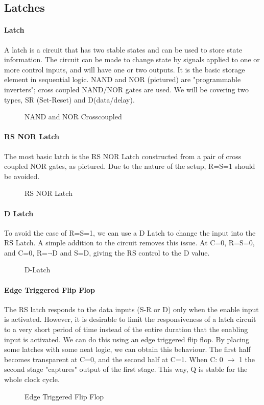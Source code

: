 \subsection{Latches}
\paragraph{Latch} A latch is a circuit that has two stable states and can be used to store state information. The circuit can be made to change state by signals applied to one or more control inputs, and will have one or two outputs. It is the basic storage element in sequential logic. NAND and NOR (pictured) are "programmable inverters"; cross coupled NAND/NOR gates are used. We will be covering two types, SR (Set-Reset) and D(data/delay).
\begin{figure}[!htb]
	\caption{\label{fig:nandnor} NAND and NOR Crosscoupled}
\end{figure}
\paragraph{RS NOR Latch} The most basic latch is the RS NOR Latch constructed from a pair of cross coupled NOR gates, as pictured. Due to the nature of the setup, R=S=1 should be avoided.
\begin{figure}[!htb]
	\caption{\label{fig:norlatch} RS NOR Latch}
\end{figure}
\paragraph{D Latch} To avoid the case of R=S=1, we can use a D Latch to change the input into the RS Latch. A simple addition to the circuit removes this issue. At C=0, R=S=0, and C=0, R=$\neg$D and S=D, giving the RS control to the D value.
\begin{figure}[!htb]
	\caption{\label{fig:dlatch} D-Latch}
\end{figure}
\paragraph{Edge Triggered Flip Flop} The RS latch responds to the data inputs (S-R or D) only when the enable input is activated. However, it is desirable to limit the responsiveness of a latch circuit to a very short period of time instead of the entire duration that the enabling input is activated. We can do this using an edge triggered flip flop. By placing some latches with some neat logic, we can obtain this behaviour. The first half becomes transparent at C=0, and the second half at C=1. When C: 0 $\rightarrow$ 1 the second stage "captures" output of the first stage. This way, Q is stable for the whole clock cycle.
\begin{figure}[!htb]
	\caption{\label{fig:flipflop} Edge Triggered Flip Flop}
\end{figure}
